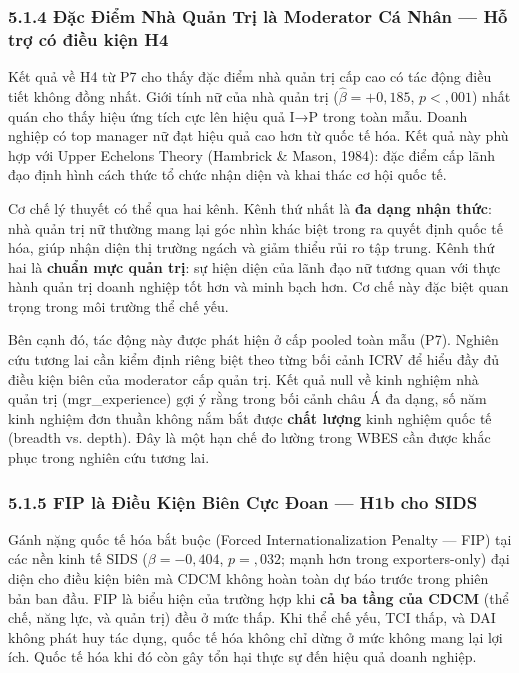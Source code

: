 \documentclass[12pt,a4paper]{article}
\begin{document}
\hypertarget{514-ux111ux1eb7c-ux111iux1ec3m-nhuxe0-quux1ea3n-trux1ecb-luxe0-moderator-cuxe1-nhuxe2n--hux1ed7-trux1ee3-cuxf3-ux111iux1ec1u-kiux1ec7n-h4}{%
\subsubsection{5.1.4 Đặc Điểm Nhà Quản Trị là Moderator Cá Nhân --- Hỗ
trợ có điều kiện
H4}\label{514-ux111ux1eb7c-ux111iux1ec3m-nhuxe0-quux1ea3n-trux1ecb-luxe0-moderator-cuxe1-nhuxe2n--hux1ed7-trux1ee3-cuxf3-ux111iux1ec1u-kiux1ec7n-h4}}

Kết quả về H4 từ P7 cho thấy đặc điểm nhà quản trị cấp cao có tác động
điều tiết không đồng nhất. Giới tính nữ của nhà quản trị
(\(\hat{\beta} = +0{,}185\), \(p < {,}001\)) nhất quán cho thấy hiệu ứng
tích cực lên hiệu quả I→P trong toàn mẫu. Doanh nghiệp có top manager nữ
đạt hiệu quả cao hơn từ quốc tế hóa. Kết quả này phù hợp với Upper
Echelons Theory (Hambrick \& Mason, 1984): đặc điểm cấp lãnh đạo định
hình cách thức tổ chức nhận diện và khai thác cơ hội quốc tế.

Cơ chế lý thuyết có thể qua hai kênh. Kênh thứ nhất là \textbf{đa dạng
nhận thức}: nhà quản trị nữ thường mang lại góc nhìn khác biệt trong ra
quyết định quốc tế hóa, giúp nhận diện thị trường ngách và giảm thiểu
rủi ro tập trung. Kênh thứ hai là \textbf{chuẩn mực quản trị}: sự hiện
diện của lãnh đạo nữ tương quan với thực hành quản trị doanh nghiệp tốt
hơn và minh bạch hơn. Cơ chế này đặc biệt quan trọng trong môi trường
thể chế yếu.

Bên cạnh đó, tác động này được phát hiện ở cấp pooled toàn mẫu (P7).
Nghiên cứu tương lai cần kiểm định riêng biệt theo từng bối cảnh ICRV để
hiểu đầy đủ điều kiện biên của moderator cấp quản trị. Kết quả null về
kinh nghiệm nhà quản trị (mgr\_experience) gợi ý rằng trong bối cảnh
châu Á đa dạng, số năm kinh nghiệm đơn thuần không nắm bắt được
\textbf{chất lượng} kinh nghiệm quốc tế (breadth vs. depth). Đây là một
hạn chế đo lường trong WBES cần được khắc phục trong nghiên cứu tương
lai.

\hypertarget{515-fip-luxe0-ux111iux1ec1u-kiux1ec7n-biuxean-cux1ef1c-ux111oan--h1b-cho-sids}{%
\subsubsection{5.1.5 FIP là Điều Kiện Biên Cực Đoan --- H1b cho
SIDS}\label{515-fip-luxe0-ux111iux1ec1u-kiux1ec7n-biuxean-cux1ef1c-ux111oan--h1b-cho-sids}}

Gánh nặng quốc tế hóa bắt buộc (Forced Internationalization Penalty ---
FIP) tại các nền kinh tế SIDS (\(\beta = -0{,}404\), \(p = {,}032\);
mạnh hơn trong exporters-only) đại diện cho điều kiện biên mà CDCM không
hoàn toàn dự báo trước trong phiên bản ban đầu. FIP là biểu hiện của
trường hợp khi \textbf{cả ba tầng của CDCM} (thể chế, năng lực, và quản
trị) đều ở mức thấp. Khi thể chế yếu, TCI thấp, và DAI không phát huy
tác dụng, quốc tế hóa không chỉ dừng ở mức không mang lại lợi ích. Quốc
tế hóa khi đó còn gây tổn hại thực sự đến hiệu quả doanh nghiệp.
\end{document}
